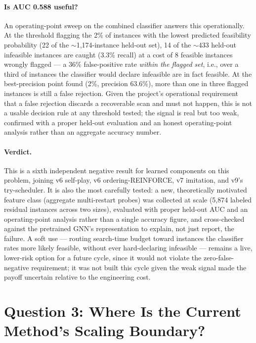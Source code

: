 \documentclass[12pt]{article}
\begin{document}
\paragraph{Is AUC 0.588 useful?} An operating-point sweep on the combined classifier answers this operationally. At the threshold flagging the 2\% of instances with the lowest predicted feasibility probability (22 of the $\sim$1{,}174-instance held-out set), 14 of the $\sim$433 held-out infeasible instances are caught (3.3\% recall) at a cost of 8 feasible instances wrongly flagged --- a 36\% false-positive rate \emph{within the flagged set}, i.e., over a third of instances the classifier would declare infeasible are in fact feasible. At the best-precision point found (2\%, precision 63.6\%), more than one in three flagged instances is still a false rejection. Given the project's operational requirement that a false rejection discards a recoverable scan and must not happen, this is not a usable decision rule at any threshold tested; the signal is real but too weak, confirmed with a proper held-out evaluation and an honest operating-point analysis rather than an aggregate accuracy number.

\paragraph{Verdict.} This is a sixth independent negative result for learned components on this problem, joining v6 self-play, v6 ordering-REINFORCE, v7 imitation, and v9's try-scheduler. It is also the most carefully tested: a new, theoretically motivated feature class (aggregate multi-restart probes) was collected at scale (5{,}874 labeled residual instances across two sizes), evaluated with proper held-out AUC and an operating-point analysis rather than a single accuracy figure, and cross-checked against the pretrained GNN's representation to explain, not just report, the failure. A soft use --- routing search-time budget toward instances the classifier rates more likely feasible, without ever hard-declaring infeasible --- remains a live, lower-risk option for a future cycle, since it would not violate the zero-false-negative requirement; it was not built this cycle given the weak signal made the payoff uncertain relative to the engineering cost.

\section{Question 3: Where Is the Current Method's Scaling Boundary?}
\end{document}
